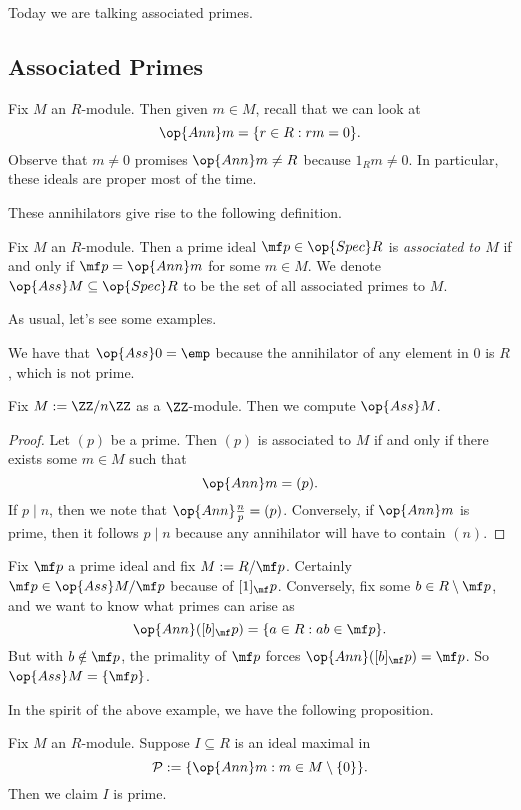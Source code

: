 
Today we are talking associated primes.

\subsection{Associated Primes}
Fix $M$ an $R$-module. Then given $m\in M$, recall that we can look at
\[\op{Ann}m=\{r\in R:rm=0\}.\]
Observe that $m\ne0$ promises $\op{Ann}m\ne R$ because $1_Rm\ne0$. In particular, these ideals are proper most of the time.

These annihilators give rise to the following definition.
\begin{definition}
	Fix $M$ an $R$-module. Then a prime ideal $\mf p\in\op{Spec}R$ is \textit{associated to $M$} if and only if $\mf p=\op{Ann}m$ for some $m\in M$. We denote $\op{Ass}M\subseteq\op{Spec}R$ to be the set of all associated primes to $M$.
\end{definition}
As usual, let's see some examples.
\begin{example}
	We have that $\op{Ass}0=\emp$ because the annihilator of any element in $0$ is $R$, which is not prime.
\end{example}
\begin{exe}
	Fix $M:=\ZZ/n\ZZ$ as a $\ZZ$-module. Then we compute $\op{Ass}M$.
\end{exe}
\begin{proof}
	Let $(p)$ be a prime. Then $(p)$ is associated to $M$ if and only if there exists some $m\in M$ such that
	\[\op{Ann}m=(p).\]
	If $p\mid n$, then we note that $\op{Ann}\frac np=(p)$. Conversely, if $\op{Ann}m$ is prime, then it follows $p\mid n$ because any annihilator will have to contain $(n)$. %
\end{proof}
\begin{example}
	Fix $\mf p$ a prime ideal and fix $M:=R/\mf p$. Certainly $\mf p\in\op{Ass}M/\mf p$ because of $[1]_\mf p$. Conversely, fix some $b\in R\setminus\mf p$, and we want to know what primes can arise as
	\[\op{Ann}([b]_\mf p)=\{a\in R:ab\in\mf p\}.\]
	But with $b\notin\mf p$, the primality of $\mf p$ forces $\op{Ann}([b]_\mf p)=\mf p$. So $\op{Ass}M=\{\mf p\}$.
\end{example}
In the spirit of the above example, we have the following proposition.
\begin{proposition} \label{prop:generateass}
	Fix $M$ an $R$-module. Suppose $I\subseteq R$ is an ideal maximal in
	\[\mathcal P:=\{\op{Ann}m:m\in M\setminus\{0\}\}.\]
	Then we claim $I$ is prime.
\end{proposition}
